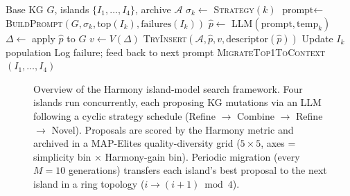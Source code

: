 \begin{algorithm}[t]
\caption{Harmony search --- one generation}\label{alg:harmony}
\begin{algorithmic}[1]
\REQUIRE Base KG $G$, islands $\{I_1, \ldots, I_4\}$, archive $\mathcal{A}$
  \STATE $\sigma_k \gets$ \textsc{Strategy}$(k)$ 
  \STATE $\text{prompt} \gets$ \textsc{BuildPrompt}$(G, \sigma_k, \text{top}(I_k), \text{failures}(I_k))$
  \STATE $\hat{p} \gets$ \textsc{LLM}$(\text{prompt}, \text{temp}_k)$
    \STATE $\Delta \gets$ apply $\hat{p}$ to $G$
    \STATE $v \gets V(\Delta)$ 
    \STATE \textsc{TryInsert}$(\mathcal{A}, \hat{p}, v, \text{descriptor}(\hat{p}))$ 
    \STATE Update $I_k$ population
  \ELSE
    \STATE Log failure; feed back to next prompt
  \ENDIF
\ENDFOR
{}
  \STATE \textsc{MigrateTop1ToContext}$(I_1, \ldots, I_4)$ 
\ENDIF
\end{algorithmic}
\end{algorithm}

\begin{figure}[t]
  \centering
  
  \caption{Overview of the Harmony island-model search framework.  Four islands
    run concurrently, each proposing KG mutations via an LLM following a cyclic
    strategy schedule (Refine $\to$ Combine $\to$ Refine $\to$ Novel).  Proposals
    are scored by the Harmony metric and archived in a MAP-Elites quality-diversity
    grid ($5 \times 5$, axes = simplicity bin $\times$ Harmony-gain bin).  Periodic
    migration (every $M=10$ generations) transfers each island's best proposal
    to the next island in a ring topology ($i \to (i{+}1) \bmod 4$).}
  \label{fig:architecture}
\end{figure}
